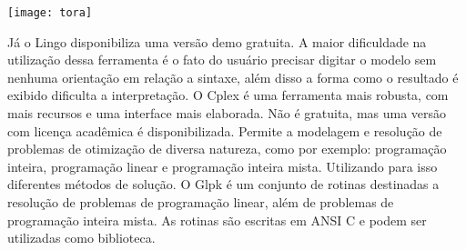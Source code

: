 \begin{center}
	\texttt{[image: tora]}
\end{center}

Já o Lingo disponibiliza uma versão demo gratuita. A maior dificuldade na utilização dessa ferramenta é o fato do usuário precisar digitar o modelo sem nenhuma orientação em relação a sintaxe, além disso a forma como o resultado é exibido dificulta a interpretação.
O Cplex é uma ferramenta mais robusta, com mais recursos e uma interface mais elaborada. Não é gratuita, mas uma versão com licença acadêmica é disponibilizada. Permite a modelagem e resolução de problemas de otimização de diversa natureza, como por exemplo: programação inteira, programação linear e programação inteira mista. Utilizando para isso diferentes métodos de solução.
O Glpk é um conjunto de rotinas destinadas a resolução de problemas de programação linear, além de problemas de programação inteira mista. As rotinas são escritas em ANSI C e podem ser utilizadas como biblioteca.

